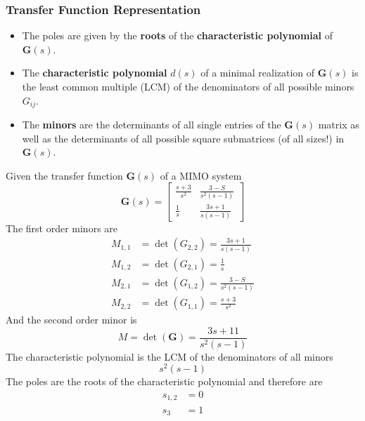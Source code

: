 \subsubsection{Transfer Function Representation}
\begin{itemize}
    \item The poles are given by the \textbf{roots} of the \textbf{characteristic polynomial} of $\mathbf{G}(s)$.
    \item The \textbf{characteristic polynomial} $d(s)$ of a minimal realization of $\mathbf{G}(s)$ is the least common multiple (LCM) of the denominators of all possible minors $G_{ij}$.
    \item The \textbf{minors} are the determinants of all single entries of the $\mathbf{G}(s)$ matrix as well as the determinants of all possible square submatrices (of all sizes!) in $\mathbf{G}(s)$.
\end{itemize}

\begin{examplesection}
    Given the transfer function $\mathbf{G}(s)$ of a MIMO system
    \begin{equation*}
        \mathbf{G}(s) = \begin{bmatrix}
            \frac{s+3}{s^2} & \frac{3-S}{s^2(s-1)} \\
            \frac{1}{s}     & \frac{3s+1}{s(s-1)}
        \end{bmatrix}
    \end{equation*}
    The first order minors are
    \begin{align*}
        M_{1,1} & = \det(G_{2,2}) = \frac{3s+1}{s(s-1)}  \\
        M_{1,2} & = \det(G_{2,1}) = \frac{1}{s}          \\
        M_{2,1} & = \det(G_{1,2}) = \frac{3-S}{s^2(s-1)} \\
        M_{2,2} & = \det(G_{1,1}) = \frac{s+3}{s^2}
    \end{align*}
    And the second order minor is
    \begin{equation*}
        M = \det(\mathbf{G}) = \frac{3s+11}{s^2(s-1)}
    \end{equation*}
    The characteristic polynomial is the LCM of the denominators of all minors
    \begin{equation*}
        s^2(s-1)
    \end{equation*}
    The poles are the roots of the characteristic polynomial and therefore are
    \begin{align*}
        s_{1,2} & = 0 \\
        s_3     & = 1
    \end{align*}
\end{examplesection}

